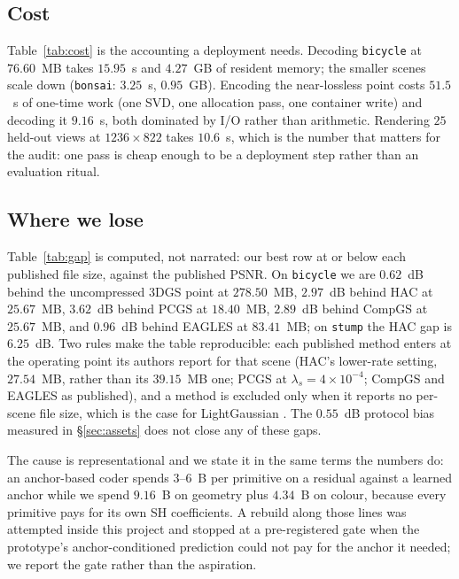 \documentclass[preprint,number,3p]{elsarticle}
\begin{document}


\subsection{Cost}
\label{sec:cost}

Table~\ref{tab:cost} is the accounting a deployment needs. Decoding \texttt{bicycle} at $76.60$~MB takes $15.95$~s
and $4.27$~GB of resident memory; the smaller scenes scale down (\texttt{bonsai}: $3.25$~s, $0.95$~GB). Encoding the
near-lossless point costs $51.5$~s of one-time work (one SVD, one allocation pass, one container write) and decoding
it $9.16$~s, both dominated by I/O rather than arithmetic. Rendering $25$ held-out views at $1236 \times 822$ takes
$10.6$~s, which is the number that matters for the audit: one pass is cheap enough to be a deployment step rather
than an evaluation ritual.



\subsection{Where we lose}
\label{sec:published}

Table~\ref{tab:gap} is computed, not narrated: our best row at or below each published file size, against the
published PSNR. On \texttt{bicycle} we are $0.62$~dB behind the uncompressed 3DGS point at $278.50$~MB, $2.97$~dB
behind HAC at $25.67$~MB, $3.62$~dB behind PCGS at $18.40$~MB, $2.89$~dB behind CompGS at $25.67$~MB, and $0.96$~dB
behind EAGLES \cite{eagles} at $83.41$~MB; on \texttt{stump} the HAC gap is $6.25$~dB. Two rules make the table
reproducible: each
published method enters at the operating point its authors report for that scene (HAC's lower-rate setting,
$27.54$~MB, rather than its $39.15$~MB one; PCGS at $\lambda_s = 4\times10^{-4}$; CompGS and EAGLES as published), and
a method is excluded only when it reports no per-scene file size, which is the case for LightGaussian
\cite{lightgaussian}. The $0.55$~dB
protocol bias measured in \S\ref{sec:assets} does not close any of these gaps.

The cause is representational and we state it in the same terms the numbers do: an anchor-based coder spends $3$--$6$~B
per primitive on a residual against a learned anchor while we spend $9.16$~B on geometry plus $4.34$~B on colour,
because every primitive pays for its own SH coefficients. A rebuild along those lines was attempted inside this
project and stopped at a pre-registered gate when the prototype's anchor-conditioned prediction could not pay for the
anchor it needed; we report the gate rather than the aspiration.
\end{document}
